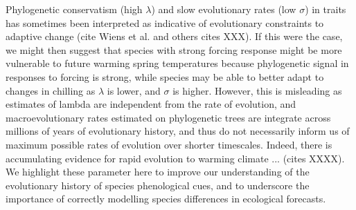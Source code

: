 \documentclass{article}\usepackage[]{graphicx}\usepackage[]{color}
\begin{document}
Phylogenetic conservatism (high $\lambda$) and slow evolutionary rates (low $\sigma$) in traits has sometimes been interpreted as indicative of evolutionary constraints to adaptive change (cite Wiens et al. and others cites XXX). If this were the case, we might then suggest that species with strong forcing response might be more vulnerable to future warming spring temperatures because phylogenetic signal in responses to forcing is strong, while species may be able to better adapt to changes in chilling as $\lambda$ is lower, and $\sigma$ is higher. However, this is misleading as estimates of lambda are independent from the rate of evolution, and macroevolutionary rates estimated on phylogenetic trees are integrate across millions of years of evolutionary history, and thus do not necessarily inform us of maximum possible rates of evolution over shorter timescales. Indeed, there is accumulating evidence for rapid evolution to warming climate ... (cites XXXX). We highlight these parameter here to improve our understanding of the evolutionary history of species phenological cues, and to underscore the importance of correctly modelling species differences in ecological forecasts. 
\\

\end{document}
